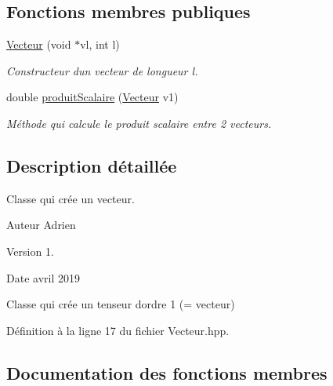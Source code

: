 \subsection*{Fonctions membres publiques}
\begin{DoxyCompactItemize}
\item 
\mbox{\label{class_vecteur_a71bd85d7378f24e08e9507570d822b7e}} 
\hyperlink{class_vecteur_a71bd85d7378f24e08e9507570d822b7e}{Vecteur} (void $\ast$vl, int l)
\begin{DoxyCompactList}\small\item\em Constructeur d\textquotesingle{}un vecteur de longueur l. \end{DoxyCompactList}\item 
double \hyperlink{class_vecteur_a21c930ceae6b18def6b37689abceeef7}{produit\+Scalaire} (\hyperlink{class_vecteur}{Vecteur} v1)
\begin{DoxyCompactList}\small\item\em Méthode qui calcule le produit scalaire entre 2 vecteurs. \end{DoxyCompactList}\end{DoxyCompactItemize}


\subsection{Description détaillée}
Classe qui crée un vecteur. 

\begin{DoxyAuthor}{Auteur}
Adrien 
\end{DoxyAuthor}
\begin{DoxyVersion}{Version}
1. 
\end{DoxyVersion}
\begin{DoxyDate}{Date}
avril 2019
\end{DoxyDate}
Classe qui crée un tenseur d\textquotesingle{}ordre 1 (= vecteur) 

Définition à la ligne 17 du fichier Vecteur.\+hpp.



\subsection{Documentation des fonctions membres}
\mbox{\label{class_vecteur_a21c930ceae6b18def6b37689abceeef7}} 
